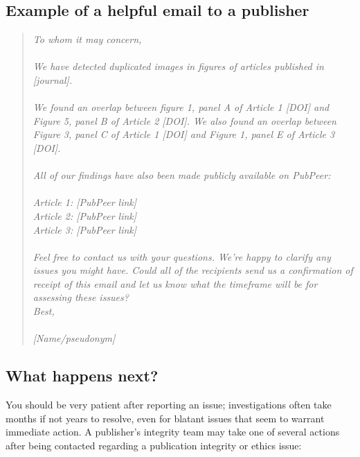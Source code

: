 \documentclass[letterpaper, 12pt]{article}
\begin{document}
\subsection*{Example of a helpful email to a publisher}

\begin{quote}
\textit{To whom it may concern,}\\
\indent\\
\textit{We have detected duplicated images in figures of articles published in [journal].}\\
\indent\\
\textit{We found an overlap between figure 1, panel A of Article 1 [DOI] and Figure 5, panel B of Article 2 [DOI]. We also found an overlap between Figure 3, panel C of Article 1 [DOI] and Figure 1, panel E of Article 3 [DOI].}\\
\indent\\
\textit{All of our findings have also been made publicly available on PubPeer:}\\
\indent\\
\textit{Article 1: [PubPeer link]\\
Article 2: [PubPeer link]\\
Article 3: [PubPeer link]\\}
\indent\\
\textit{Feel free to contact us with your questions. We’re happy to clarify any issues you might have. Could all of the recipients send us a confirmation of receipt of this email and let us know what the timeframe will be for assessing these issues?}\\
\indent
\textit{Best,}\\
\indent\\
\textit{[Name/pseudonym]}
\end{quote}

\subsection*{What happens next?}

You should be very patient after reporting an issue; investigations often take months if not years to resolve, even for blatant issues that seem to warrant immediate action. A publisher's integrity team may take one of several actions after being contacted regarding a publication integrity or ethics issue:
\end{document}
